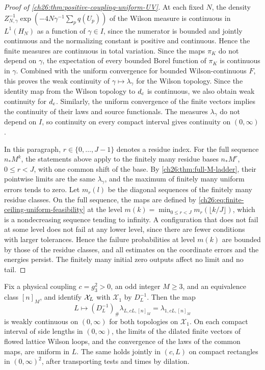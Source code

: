 \begin{proof}[Proof of \cref{ch26:thm:positive-coupling-uniform-UV}]
At each fixed $N$, the density $Z_{N,\gamma}^{-1}\exp(-4N\gamma^{-1}\sum_pq(U_p))$ of the Wilson measure is continuous in $L^1(H_N)$ as a function of $\gamma\in I$, since the numerator is bounded and jointly continuous and the normalizing constant is positive and continuous. Hence the finite measures are continuous in total variation. Since the maps $\pi_K$ do not depend on $\gamma$, the expectation of every bounded Borel function of $\pi_K$ is continuous in $\gamma$. Combined with the uniform convergence for bounded Wilson-continuous $F$, this proves the weak continuity of $\gamma\mapsto\lambda_\gamma$ for the Wilson topology. Since the identity map from the Wilson topology to $d_c$ is continuous, we also obtain weak continuity for $d_c$. Similarly, the uniform convergence of the finite vectors implies the continuity of their laws and source functionals. The measures $\lambda_\gamma$ do not depend on $I$, so continuity on every compact interval gives continuity on $(0,\infty)$.

In this paragraph, $r\in\{0,\dots,J-1\}$ denotes a residue index. For the full sequence $n_*M^k$, the statements above apply to the finitely many residue bases $n_*M^r$, $0\le r<J$, with one common shift of the base. By \cref{ch26:thm:full-M-ladder}, their pointwise limits are the same $\lambda_\gamma$, and the maximum of finitely many uniform errors tends to zero. Let $m_r(l)$ be the diagonal sequences of the finitely many residue classes. On the full sequence, the maps are defined by \eqref{ch26:eq:finite-ceiling-uniform-feasibility} at the level $m(k)=\min_{0\le r<J}m_r(\lfloor k/J\rfloor)$, which is a nondecreasing sequence tending to infinity. A configuration that does not fail at some level does not fail at any lower level, since there are fewer conditions with larger tolerances. Hence the failure probabilities at level $m(k)$ are bounded by those of the residue classes, and all estimates on the coordinate errors and the energies persist. The finitely many initial zero outputs affect no limit and no tail.
\end{proof}

\begin{corollary}\label{ch26:cor:continuous-torus-side}
Fix a physical coupling $c=g_3^2>0$, an odd integer $M\ge3$, and an equivalence class $[n]_M$, and identify $\mathcal X_L$ with $\mathcal X_1$ by $D_L^{-1}$. Then the map
\[
 L\longmapsto(D_L^{-1})_\#\lambda_{L,cL,[n]_M}=\lambda_{1,cL,[n]_M}
\]
is weakly continuous on $(0,\infty)$ for both topologies on $\mathcal X_1$. On each compact interval of side lengths in $(0,\infty)$, the limits of the dilated finite vectors of flowed lattice Wilson loops, and the convergence of the laws of the common maps, are uniform in $L$. The same holds jointly in $(c,L)$ on compact rectangles in $(0,\infty)^2$, after transporting tests and times by dilation.
\end{corollary}


